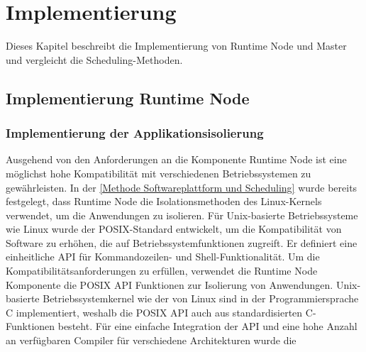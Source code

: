 \chapter{Implementierung}

Dieses Kapitel beschreibt die Implementierung von Runtime Node und Master und vergleicht die Scheduling-Methoden.

\section{Implementierung Runtime Node}


\subsection{Implementierung der Applikationsisolierung}
Ausgehend von den Anforderungen an die Komponente Runtime Node ist eine möglichst hohe Kompatibilität mit verschiedenen Betriebssystemen zu gewährleisten. In der \autoref{Methode Softwareplattform und Scheduling} wurde bereits festgelegt, dass Runtime Node die Isolationsmethoden des Linux-Kernels verwendet, um die Anwendungen zu isolieren. Für Unix-basierte Betriebssysteme wie Linux wurde der \gls{POSIX}-Standard entwickelt, um die Kompatibilität von Software zu erhöhen, die auf Betriebssystemfunktionen zugreift. Er definiert eine einheitliche \gls{API} für Kommandozeilen- und Shell-Funktionalität. Um die Kompatibilitätsanforderungen zu erfüllen, verwendet die Runtime Node Komponente die \gls{POSIX} \gls{API} Funktionen zur Isolierung von Anwendungen. Unix-basierte Betriebssystemkernel wie der von Linux sind in der Programmiersprache C implementiert, weshalb die \gls{POSIX} \gls{API} auch aus standardisierten C-Funktionen besteht. Für eine einfache Integration der \gls{API} und eine hohe Anzahl an verfügbaren Compiler für verschiedene Architekturen wurde die 